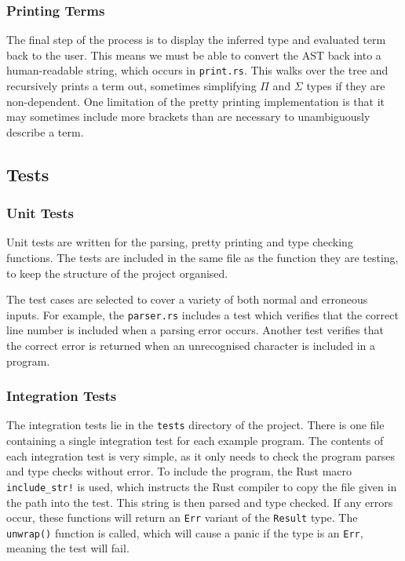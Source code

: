 \documentclass[12pt,a4paper,twoside]{report}
\begin{document}
\subsubsection{Printing Terms}

The final step of the process is to display the inferred type and evaluated term back to the user.
This means we must be able to convert the AST back into a human-readable string, which occurs in \texttt{print.rs}.
This walks over the tree and recursively prints a term out, sometimes simplifying \(\Pi\) and \(\Sigma\) types if they are non-dependent.
One limitation of the pretty printing implementation is that it may sometimes include more brackets than are necessary to unambiguously describe a term.

\subsection{Tests}

\subsubsection{Unit Tests}

Unit tests are written for the parsing, pretty printing and type checking functions.
The tests are included in the same file as the function they are testing, to keep the structure of the project organised.

The test cases are selected to cover a variety of both normal and erroneous inputs.
For example, the \texttt{parser.rs} includes a test which verifies that the correct line number is included when a parsing error occurs.
Another test verifies that the correct error is returned when an unrecognised character is included in a program.

\subsubsection{Integration Tests}

The integration tests lie in the \texttt{tests} directory of the project.
There is one file containing a single integration test for each example program.
The contents of each integration test is very simple, as it only needs to check the program parses and type checks without error.
To include the program, the Rust macro \texttt{include\_str!} is used, which instructs the Rust compiler to copy the file given in the path into the test.
This string is then parsed and type checked.
If any errors occur, these functions will return an \texttt{Err} variant of the \texttt{Result} type.
The \texttt{unwrap()} function is called, which will cause a panic if the type is an \texttt{Err}, meaning the test will fail.
\end{document}
